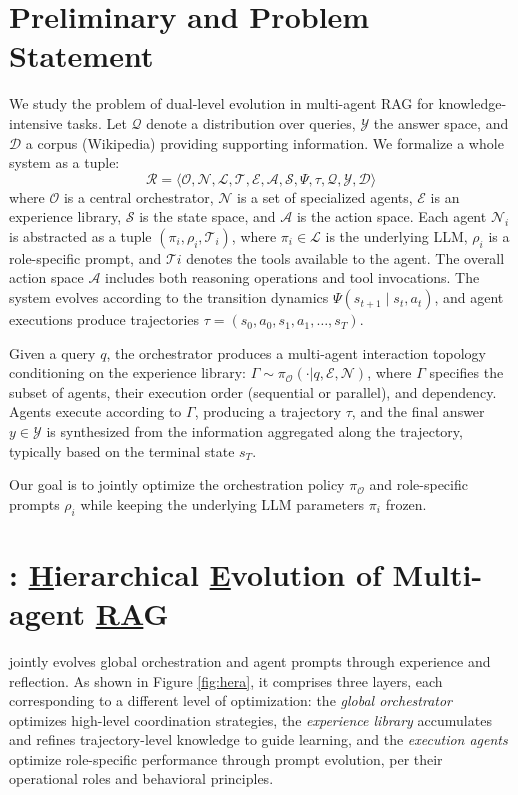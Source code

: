 \vspace{-5pt}
\section{Preliminary and Problem Statement}
\vspace{-2pt}
\label{sec:probelm_formulate}
We study the problem of dual-level evolution in multi-agent RAG for knowledge-intensive tasks. Let $\mathcal{Q}$ denote a distribution over queries, $\mathcal{Y}$ the answer space, and $\mathcal{D}$ a corpus (\eg Wikipedia) providing supporting information. We formalize a whole system as a tuple:
\[\mathcal{R}=\langle \mathcal{O},\mathcal{N}, \mathcal{L},  \mathcal{T}, \mathcal{E}, \mathcal{A}, \mathcal{S}, \Psi, \tau,  \mathcal{Q}, \mathcal{Y}, \mathcal{D} \rangle \] where $\mathcal{O}$ is a central orchestrator, $\mathcal{N}$ is a set of specialized agents, $\mathcal{E}$ is an experience library, $\mathcal{S}$ is the state space, and $\mathcal{A}$ is the action space. Each agent $\mathcal{N}_i$ is abstracted as a tuple $(\pi_i, \rho_i, \mathcal{T}_i)$, where $\pi_i \in \mathcal{L}$ is the underlying LLM, $\rho_i$ is a role-specific prompt, and $\mathcal{T}i$ denotes the tools available to the agent. The overall action space $\mathcal{A}$ includes both reasoning operations and tool invocations. The system evolves according to the transition dynamics $\Psi(s_{t+1} \mid s_t, a_t)$, and agent executions produce trajectories $\tau = (s_0, a_0, s_1, a_1, \dots, s_T)$.

Given a query $q$, the orchestrator produces a multi-agent interaction topology conditioning on the experience library: $\Gamma\sim\pi_{\mathcal{O}}(\cdot|q, \mathcal{E}, \mathcal{N})$, where $\Gamma$ specifies the subset of agents, their execution order (sequential or parallel), and dependency. Agents execute according to $\Gamma$, producing a trajectory $\tau$, and the final answer $y \in \mathcal{Y}$ is synthesized from the information aggregated along the trajectory, typically based on the terminal state $s_T$.

Our goal is to jointly optimize the orchestration policy $\pi_{\mathcal{O}}$ and role-specific prompts ${\rho_i}$ while keeping the underlying LLM parameters ${\pi_i}$ frozen.

\vspace{-7pt}
\section{\hero: \texorpdfstring{\underline{H}ierarchical \underline{E}volution of Multi-agent \underline{RA}G}{Hierarchical Evolution of Multi-agent RAG}}
\label{sec:hero}
\vspace{-8pt}

\hero jointly evolves global orchestration and agent prompts through experience and reflection. As shown in Figure \ref{fig:hera}, it comprises three layers, each corresponding to a different level of optimization: the \textit{global orchestrator} optimizes high-level coordination strategies, the \textit{experience library} accumulates and refines trajectory-level knowledge to guide learning, and the \textit{execution agents} optimize role-specific performance through prompt evolution, per their operational roles and behavioral principles. 

